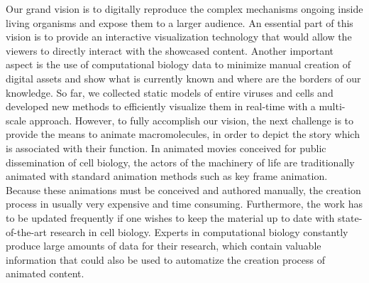 Our grand vision is to digitally reproduce the complex mechanisms ongoing inside living organisms and expose them to a larger audience.
An essential part of this vision is to provide an interactive visualization technology that would allow the viewers to directly interact with the showcased content.
Another important aspect is the use of computational biology data to minimize manual creation of digital assets and show what is currently known and where are the borders of our knowledge. 
So far, we collected static models of entire viruses and cells and developed new methods to efficiently visualize them in real-time with a multi-scale approach.
However, to fully accomplish our vision, the next challenge is to provide the means to animate macromolecules, in order to depict the story which is associated with their function.
In animated movies conceived for public dissemination of cell biology, the actors of the machinery of life are traditionally animated with standard animation methods such as key frame animation.
Because these animations must be conceived and authored manually, the creation process in usually very expensive and time consuming.
Furthermore, the work has to be updated frequently if one wishes to keep the material up to date with state-of-the-art research in cell biology.
Experts in computational biology constantly produce large amounts of data for their research, which contain valuable information that could also be used to automatize the creation process of animated content.

